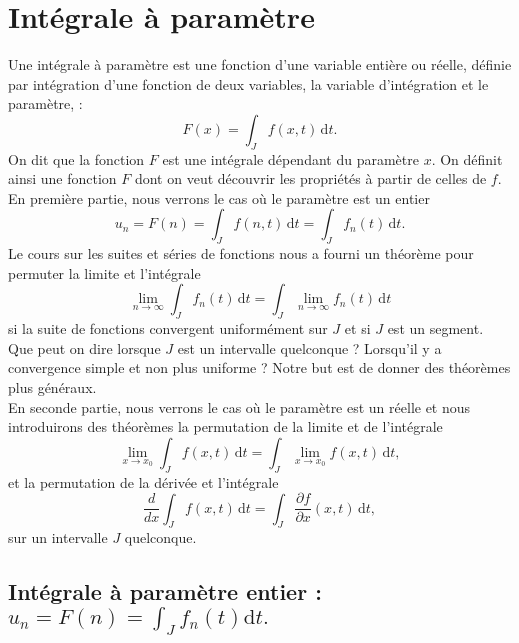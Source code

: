 \documentclass{book}
\begin{document}
\chapter*{Intégrale à paramètre}
Une intégrale  à paramètre est une fonction d'une variable entière ou
réelle, définie par intégration d'une fonction de deux variables, la variable d'intégration et le paramètre, :
$$F(x)=\int_J f(x,t)\,\mathrm dt.$$
On dit que la fonction $F$ est une intégrale dépendant du paramètre $x$. On définit ainsi une fonction $F$ dont on veut découvrir les propriétés à partir
de celles de $f$.\\ 
En première partie, nous verrons le cas où le paramètre est un entier $$u_n=F(n)=\int_J f(n,t)\,\mathrm dt=\int_J f_n(t)\,\mathrm dt.$$ Le cours sur les suites et séries de fonctions nous a fourni un théorème pour permuter la limite et l'intégrale $$\lim_{n\to \infty}\int_J f_n(t)\,\mathrm dt=\int_J \lim_{n\to \infty}f_n(t)\,\mathrm dt$$ si la suite de fonctions convergent uniformément sur $J$ et si $J$ est un segment. Que peut on dire lorsque $J$ est un intervalle quelconque ? Lorsqu'il y a convergence simple et non plus uniforme ?
Notre but est  de donner des théorèmes plus généraux.\\
En seconde partie,  nous verrons le cas où le paramètre est un réelle et nous introduirons des théorèmes la permutation de la limite et de l'intégrale 
$$\lim_{x\to x_0}\int_J f(x,t)\, \mathrm dt=\int_J \lim_{x\to x_0} f(x,t)\, \mathrm dt,$$
et la permutation de la dérivée et  l'intégrale 
$$\frac{d}{dx} \int_J f(x,t)\,\mathrm dt = \int_J \frac{\partial f}{\partial x }(x,t) \,\mathrm dt,$$ 
sur un intervalle $J$ quelconque. 





\section{Intégrale à paramètre entier : $ u_n =F(n)= \int_J f_n(t)\mathrm dt.$}
\end{document}
